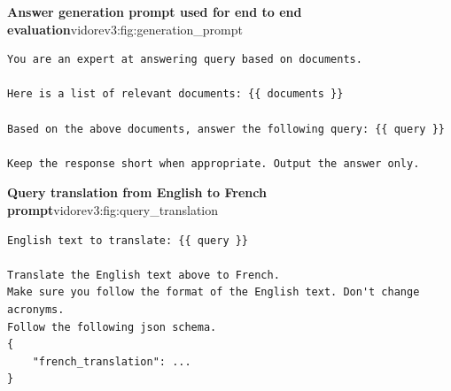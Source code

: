 \begin{promptfigure}{\textbf{Answer generation prompt used for end to end evaluation}}{vidorev3:fig:generation_prompt}
\begin{Verbatim}[breaklines=true,breakanywhere=true,fontsize=\scriptsize]
You are an expert at answering query based on documents.

Here is a list of relevant documents: {{ documents }}

Based on the above documents, answer the following query: {{ query }}

Keep the response short when appropriate. Output the answer only.
\end{Verbatim}
\end{promptfigure}

\begin{promptfigure}{\textbf{Query translation from English to French prompt}}{vidorev3:fig:query_translation}
\begin{Verbatim}[breaklines=true,breakanywhere=true,fontsize=\scriptsize]
English text to translate: {{ query }}

Translate the English text above to French.
Make sure you follow the format of the English text. Don't change acronyms.
Follow the following json schema.
{
    "french_translation": ...
}
\end{Verbatim}
\end{promptfigure}

